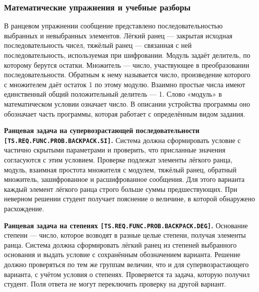 \documentclass[12pt,a4paper]{article}
\begin{document}
\subsubsection{Математические упражнения и учебные разборы}\label{ux43cux430ux442ux435ux43cux430ux442ux438ux447ux435ux441ux43aux438ux435-ux443ux43fux440ux430ux436ux43dux435ux43dux438ux44f-ux438-ux443ux447ux435ux431ux43dux44bux435-ux440ux430ux437ux431ux43eux440ux44b}

\hypertarget{математические-упражнения-и-учебные-разборы}{}

В ранцевом упражнении сообщение представлено последовательностью выбранных и невыбранных элементов. Лёгкий ранец --- закрытая исходная последовательность чисел, тяжёлый ранец --- связанная с ней последовательность, используемая при шифровании. Модуль задаёт делитель, по которому берутся остатки. Множитель --- число, участвующее в преобразовании последовательности. Обратным к нему называется число, произведение которого с множителем даёт остаток 1 по этому модулю. Взаимно простые числа имеют единственный общий положительный делитель --- 1. Слово «модуль» в математическом условии означает число. В описании устройства программы оно обозначает часть программы, которая работает с определённым видом задания.

\hypertarget{ts-req-func-prob-backpack-si}{} \textbf{Ранцевая задача на супервозрастающей последовательности \texttt{[TS.\allowbreak{}REQ.\allowbreak{}FUNC.\allowbreak{}PROB.\allowbreak{}BACKPACK.\allowbreak{}SI]}.} Система должна сформировать условие с частично скрытыми параметрами и проверить, что присланные значения согласуются с этим условием. Проверке подлежат элементы лёгкого ранца, модуль, взаимная простота множителя с модулем, тяжёлый ранец, обратный множитель, зашифрованное и расшифрованное сообщения. Для этого варианта каждый элемент лёгкого ранца строго больше суммы предшествующих. При неверном решении студент получает пояснение о величине, в которой обнаружено расхождение.

\hypertarget{ts-req-func-prob-backpack-deg}{} \textbf{Ранцевая задача на степенях \texttt{[TS.\allowbreak{}REQ.\allowbreak{}FUNC.\allowbreak{}PROB.\allowbreak{}BACKPACK.\allowbreak{}DEG]}.} Основание степени --- число, которое возводят в разные целые степени, получая элементы ранца. Система должна сформировать лёгкий ранец из степеней выбранного основания и выдать условие с сохранённым обозначением варианта. Решение должно проверяться по тем же группам величин, что и для супервозрастающего варианта, с учётом условия о степенях. Проверяется та задача, которую получил студент. Поля ответа не могут переключить проверку на другой вариант.
\end{document}
